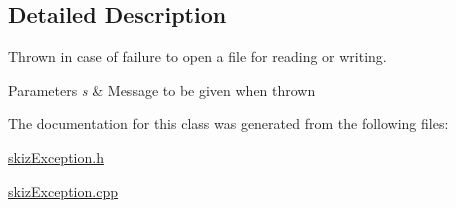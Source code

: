 \subsection{Detailed Description}
Thrown in case of failure to open a file for reading or writing. 


\begin{DoxyParams}{Parameters}
{\em s} & Message to be given when thrown \\
\hline
\end{DoxyParams}


The documentation for this class was generated from the following files\+:\begin{DoxyCompactItemize}
\item 
\mbox{\hyperlink{skizException_8h}{skiz\+Exception.\+h}}\item 
\mbox{\hyperlink{skizException_8cpp}{skiz\+Exception.\+cpp}}\end{DoxyCompactItemize}
